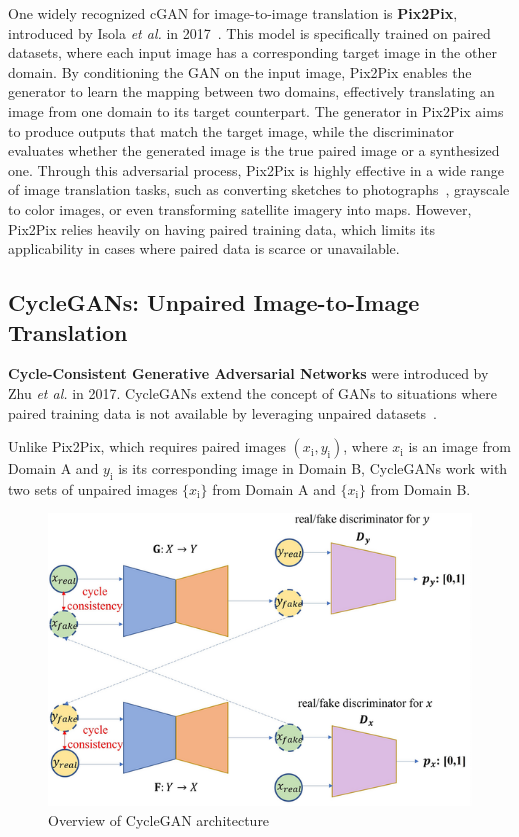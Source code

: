 \documentclass[12pt,DIV14,BCOR12mm,a4paper,footinclude=false,headinclude,parskip=half-,twoside,openright,cleardoublepage=empty,toc=index,bibliography=totoc,listof=totoc]{scrreprt}
\numberwithin{equation}{chapter}
\begin{document}
One widely recognized cGAN for image-to-image translation is \textbf{Pix2Pix}, introduced by Isola \textit{et al.} in 2017~\cite{isola2017image}. This model is specifically trained on paired datasets, where each input image has a corresponding target image in the other domain. By conditioning the GAN on the input image, Pix2Pix enables the generator to learn the mapping between two domains, effectively translating an image from one domain to its target counterpart. The generator in Pix2Pix aims to produce outputs that match the target image, while the discriminator evaluates whether the generated image is the true paired image or a synthesized one. Through this adversarial process, Pix2Pix is highly effective in a wide range of image translation tasks, such as converting sketches to photographs~\cite{sangkloy2017scribbler}, grayscale to color images, or even transforming satellite imagery into maps. However, Pix2Pix relies heavily on having paired training data, which limits its applicability in cases where paired data is scarce or unavailable.
\subsection{CycleGANs: Unpaired Image-to-Image Translation}
\textbf{Cycle-Consistent Generative Adversarial Networks} were introduced by Zhu \textit{et al.} in 2017. CycleGANs extend the concept of GANs to situations where paired training data is not available by leveraging unpaired datasets~\cite{zhu2017unpaired}.

Unlike Pix2Pix, which requires paired images \((x_{\text{i}}, y_{\text{i}})\), where \(x_{\text{i}}\) is an image from Domain A and \(y_{\text{i}}\) is its corresponding image in Domain B, CycleGANs work with two sets of unpaired images \(\{x_{\text{i}}\}\) from Domain A and \(\{x_{\text{i}}\}\) from Domain B.

\begin{figure}
	\centering
	\includegraphics[scale=.7]{../media/Overview-of-CycleGAN-architecture.png}
	\caption{Overview of CycleGAN architecture~\cite{article}}
	\label{cycleGAN}
\end{figure}
\end{document}
